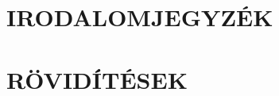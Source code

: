 

\clearpage
\section{IRODALOMJEGYZÉK}
\printbibliography[heading=none]

\clearpage
\renewcommand{\listfigurename}{ÁBRAJEGYZÉK}
\listoffigures

\clearpage
\renewcommand{\listtablename}{TÁBLAJEGYZÉK}
\listoftables

\clearpage
\section{RÖVIDÍTÉSEK}







